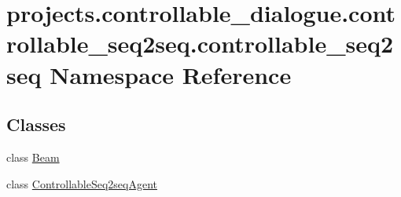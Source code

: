 \hypertarget{namespaceprojects_1_1controllable__dialogue_1_1controllable__seq2seq_1_1controllable__seq2seq}{}\section{projects.\+controllable\+\_\+dialogue.\+controllable\+\_\+seq2seq.\+controllable\+\_\+seq2seq Namespace Reference}
\label{namespaceprojects_1_1controllable__dialogue_1_1controllable__seq2seq_1_1controllable__seq2seq}
\subsection*{Classes}
\begin{DoxyCompactItemize}
\item 
class \hyperlink{classprojects_1_1controllable__dialogue_1_1controllable__seq2seq_1_1controllable__seq2seq_1_1Beam}{Beam}
\item 
class \hyperlink{classprojects_1_1controllable__dialogue_1_1controllable__seq2seq_1_1controllable__seq2seq_1_1ControllableSeq2seqAgent}{Controllable\+Seq2seq\+Agent}
\end{DoxyCompactItemize}
